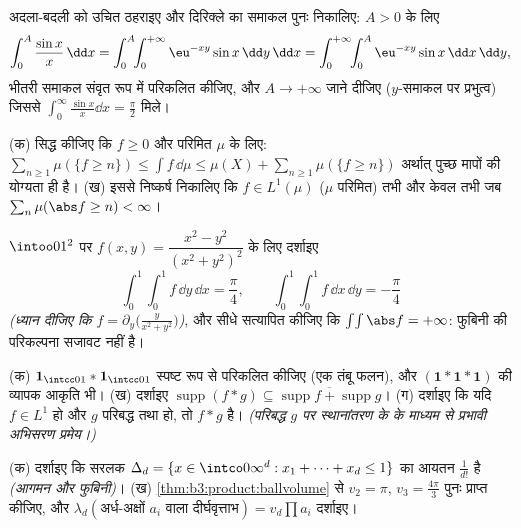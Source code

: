 \begin{exercise}[$\star$]\label{exo:b3:product:2}
अदला-बदली को उचित ठहराइए और दिरिक्ले का समाकल पुनः निकालिए:
$A > 0$ के लिए
\[
\int_0^A\frac{\sin x}x\,\dd x
= \int_0^A\!\!\int_0^{+\infty}\eu^{-xy}\sin x\,\dd y\,\dd x
= \int_0^{+\infty}\!\!\int_0^A \eu^{-xy}\sin x\,\dd x\,\dd y,
\]
भीतरी समाकल संवृत रूप में परिकलित कीजिए, और $A \to
+\infty$ जाने दीजिए
($y$-समाकल पर प्रभुत्व) जिससे $\int_0^\infty\frac{\sin x}x\dd x = \frac\pi2$ मिले।
\end{exercise}

\begin{exercise}[$\star\star$]\label{exo:b3:product:3}
(क) सिद्ध कीजिए कि  $f \geq 0$ और परिमित $\mu$ के लिए: $\sum_{n\geq1}\mu(\{f \geq n\}) \leq \int f\,\dd\mu \leq
\mu(X) + \sum_{n\geq1}\mu(\{f\geq n\})$
अर्थात्  पुच्छ मापों की योग्यता ही है।
(ख) इससे निष्कर्ष निकालिए कि $f \in L^1(\mu)$ ($\mu$ परिमित) तभी और केवल
तभी जब $\sum_n\mu(\abs f \geq n) < \infty$।
\end{exercise}

\begin{exercise}[$\star\star$]\label{exo:b3:product:4}
$\intoo01^2$ पर $f(x, y) = \dfrac{x^2 - y^2}{(x^2 + y^2)^2}$ के लिए दर्शाइए
\[
\int_0^1\!\!\int_0^1 f\,\dd y\,\dd x = \frac\pi4,
\qquad
\int_0^1\!\!\int_0^1 f\,\dd x\,\dd y = -\frac\pi4
\]
\emph{(ध्यान दीजिए कि $f = \partial_y\bigl(\frac{y}{x^2+y^2}\bigr)$)}, और सीधे सत्यापित कीजिए कि $\int\!\int\abs f = +\infty$:
फुबिनी की  परिकल्पना सजावट नहीं है।
\end{exercise}

\begin{exercise}[$\star\star$]\label{exo:b3:product:5}
(क) $\mathbf 1_{\intcc01} * \mathbf 1_{\intcc01}$ स्पष्ट रूप से परिकलित कीजिए (एक तंबू फलन), और $(\mathbf 1 * \mathbf 1 *
\mathbf 1)$ की
व्यापक आकृति भी।
(ख) दर्शाइए $\operatorname{supp}(f * g) \subseteq
\overline{\operatorname{supp}f + \operatorname{supp}g}$।
(ग) दर्शाइए कि यदि $f \in L^1$ हो और $g$ परिबद्ध तथा  हो, तो
$f * g$  है। \emph{(परिबद्ध $g$ पर स्थानांतरण के  के
माध्यम से प्रभावी अभिसरण प्रमेय।)}
\end{exercise}

\begin{exercise}[$\star\star$]\label{exo:b3:product:6}
(क) दर्शाइए कि सरलक $\Delta_d = \{x \in \intco0\infty^d
: x_1 + \dots + x_d \leq 1\}$ का आयतन $\frac1{d!}$ है \emph{(आगमन और
फुबिनी)}।
(ख) \cref{thm:b3:product:ballvolume} से $v_2 = \pi$, $v_3 = \frac{4\pi}3$ पुनः प्राप्त कीजिए, और $\lambda_d(\text{अर्ध-अक्षों } a_i \text{ वाला दीर्घवृत्ताभ}) =
v_d\prod a_i$ दर्शाइए।
\end{exercise}

